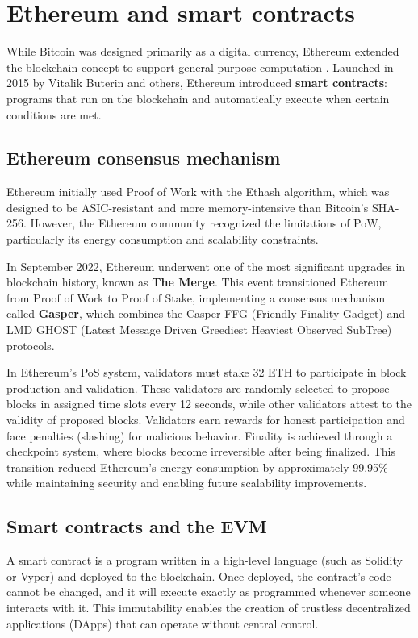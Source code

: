 \section{Ethereum and smart contracts}
While Bitcoin was designed primarily as a digital currency, Ethereum extended the blockchain concept to support general-purpose computation \cite{antonopoulos2018mastering}. Launched in 2015 by Vitalik Buterin and others, Ethereum introduced \textbf{smart contracts}: programs that run on the blockchain and automatically execute when certain conditions are met.

\subsection{Ethereum consensus mechanism}
Ethereum initially used Proof of Work with the Ethash algorithm, which was designed to be ASIC-resistant and more memory-intensive than Bitcoin's SHA-256. However, the Ethereum community recognized the limitations of PoW, particularly its energy consumption and scalability constraints.

In September 2022, Ethereum underwent one of the most significant upgrades in blockchain history, known as \textbf{The Merge}. This event transitioned Ethereum from Proof of Work to Proof of Stake, implementing a consensus mechanism called \textbf{Gasper}, which combines the Casper FFG (Friendly Finality Gadget) and LMD GHOST (Latest Message Driven Greediest Heaviest Observed SubTree) protocols.

In Ethereum's PoS system, validators must stake 32 ETH to participate in block production and validation. These validators are randomly selected to propose blocks in assigned time slots every 12 seconds, while other validators attest to the validity of proposed blocks. Validators earn rewards for honest participation and face penalties (slashing) for malicious behavior. Finality is achieved through a checkpoint system, where blocks become irreversible after being finalized. This transition reduced Ethereum's energy consumption by approximately 99.95\% while maintaining security and enabling future scalability improvements.

\subsection{Smart contracts and the EVM}
A smart contract is a program written in a high-level language (such as Solidity or Vyper) and deployed to the blockchain. Once deployed, the contract's code cannot be changed, and it will execute exactly as programmed whenever someone interacts with it. This immutability enables the creation of trustless decentralized applications (DApps) that can operate without central control.

